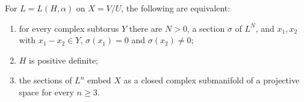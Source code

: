 \begin{theorem}[Lefschetz]
\label{mumford-source-lefschetz}
For $L=L(H,\alpha)$ on $X=V/U$, the following are equivalent:
\begin{enumerate}
\item for every complex subtorus $Y$ there are $N>0$, a section $\sigma$ of
  $L^N$, and $x_1,x_2$ with $x_1-x_2\in Y$, $\sigma(x_1)=0$ and
  $\sigma(x_2)\ne0$;
\item $H$ is positive definite;
\item the sections of $L^n$ embed $X$ as a closed complex submanifold of a
  projective space for every $n\ge3$.
\end{enumerate}
\end{theorem}

